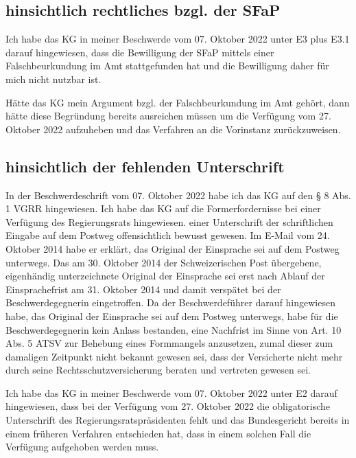 \documentclass[paper=a4, onesite]{scrreprt}
\newcounter{rz}
\newcommand{\Rz}{\addtocounter{rz}{1}\marginpar{\texttt{(\textit{\arabic{rz}})}}}
\begin{document}
\subsection{hinsichtlich rechtliches bzgl. der \acl{SFaP}} \label{RGFalsch}
\Rz Ich habe das \ac{KG} in meiner Beschwerde vom 07. Oktober 2022 unter E3 plus E3.1 darauf hingewiesen, dass die Bewilligung der \ac{SFaP} mittels einer Falschbeurkundung im Amt stattgefunden hat und die Bewilligung daher für mich nicht nutzbar ist.\\

\Rz Hätte das \ac{KG} mein Argument bzgl. der Falschbeurkundung im Amt gehört, dann hätte diese Begründung bereits ausreichen müssen um die Verfügung vom 27. Oktober 2022 aufzuheben und das Verfahren an die Vorinstanz zurückzuweisen. 
 
\subsection{hinsichtlich der fehlenden Unterschrift} \label{RGUnterschrift}

 In der Beschwerdeschrift vom 07. Oktober 2022 habe ich das \acl{KG} auf den § 8 Abs. 1 \ac{VGRR} hingewiesen. Ich habe das \ac{KG} auf die Formerfordernisse bei einer Verfügung des Regierungsrats hingewiesen. 
 einer Unterschrift der schriftlichen Eingabe auf dem Postweg offensichtlich bewusst gewesen. Im E-Mail vom 24. Oktober 2014 habe er erklärt, das Original der Einsprache sei auf dem Postweg unterwegs. Das am 30. Oktober 2014 der Schweizerischen Post übergebene, eigenhändig unterzeichnete Original der Einsprache sei erst nach Ablauf der Einsprachefrist am 31. Oktober 2014 und damit verspätet bei der Beschwerdegegnerin eingetroffen. Da der Beschwerdeführer darauf hingewiesen habe, das Original der Einsprache sei auf dem Postweg unterwegs, habe für die Beschwerdegegnerin kein Anlass bestanden, eine Nachfrist im Sinne von Art. 10 Abs. 5 ATSV zur Behebung eines Formmangels anzusetzen, zumal dieser zum damaligen Zeitpunkt nicht bekannt gewesen sei, dass der Versicherte nicht mehr durch seine Rechtsschutzversicherung beraten und vertreten gewesen sei.



\Rz Ich habe das \ac{KG} in meiner Beschwerde vom 07. Oktober 2022 unter E2 darauf hingewiesen, dass bei der Verfügung vom 27. Oktober 2022 die obligatorische Unterschrift des Regierungsratspräsidenten fehlt und das Bundesgericht bereits in einem früheren Verfahren entschieden hat, dass in einem solchen Fall die Verfügung aufgehoben werden muss.\\
\end{document}
